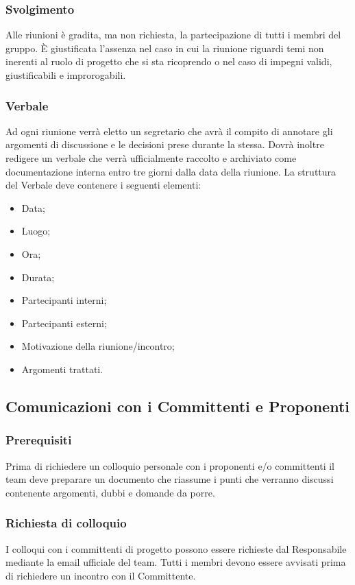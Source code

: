 \subsubsection{Svolgimento}
\label{3.3.2}
Alle riunioni è gradita, ma non richiesta, la partecipazione di tutti i membri del gruppo. È giustificata l'assenza nel caso in cui la riunione riguardi temi non inerenti al ruolo di progetto che si sta ricoprendo o nel caso di impegni validi, giustificabili e improrogabili.

\subsubsection{Verbale}
\label{3.3.3}
Ad ogni riunione verrà eletto un segretario che avrà il compito di annotare gli argomenti di discussione e le decisioni prese durante la stessa.
Dovrà inoltre redigere un verbale che verrà ufficialmente raccolto e archiviato come documentazione interna entro tre giorni dalla data della riunione.
La struttura del Verbale deve contenere i seguenti elementi:
\begin{itemize}
\item Data;
\item Luogo;
\item Ora;
\item Durata;
\item Partecipanti interni;
\item Partecipanti esterni;
\item Motivazione della riunione/incontro;
\item Argomenti trattati.
\end{itemize}

\subsection{Comunicazioni con i Committenti e Proponenti}
\label{3.4}

\subsubsection{Prerequisiti}
\label{3.4.1}
Prima di richiedere un colloquio personale con i proponenti e/o committenti il team deve preparare un documento che riassume i punti che verranno discussi contenente argomenti, dubbi e domande da porre.

\subsubsection{Richiesta di colloquio}
\label{3.4.2}
I colloqui con i committenti di progetto possono essere richieste dal Responsabile mediante la email ufficiale del team. Tutti i membri devono essere avvisati prima di richiedere un incontro con il Committente.



